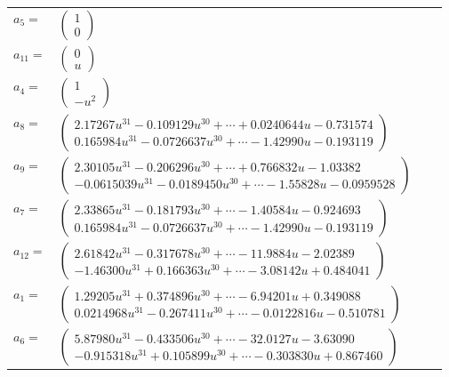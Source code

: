 \documentclass[1p]{elsarticle_modified}
\theoremstyle{definition}
\begin{document}
\begin{tabular}{m{7pt} m{180pt} m{7pt} m{180pt} }
\flushright $a_{5}=$&$\begin{pmatrix}1\\0\end{pmatrix}$ \\
\flushright $a_{11}=$&$\begin{pmatrix}0\\u\end{pmatrix}$ \\
\flushright $a_{4}=$&$\begin{pmatrix}1\\- u^2\end{pmatrix}$ \\
\flushright $a_{8}=$&$\begin{pmatrix}2.17267 u^{31}-0.109129 u^{30}+\cdots+0.0240644 u-0.731574\\0.165984 u^{31}-0.0726637 u^{30}+\cdots-1.42990 u-0.193119\end{pmatrix}$ \\
\flushright $a_{9}=$&$\begin{pmatrix}2.30105 u^{31}-0.206296 u^{30}+\cdots+0.766832 u-1.03382\\-0.0615039 u^{31}-0.0189450 u^{30}+\cdots-1.55828 u-0.0959528\end{pmatrix}$ \\
\flushright $a_{7}=$&$\begin{pmatrix}2.33865 u^{31}-0.181793 u^{30}+\cdots-1.40584 u-0.924693\\0.165984 u^{31}-0.0726637 u^{30}+\cdots-1.42990 u-0.193119\end{pmatrix}$ \\
\flushright $a_{12}=$&$\begin{pmatrix}2.61842 u^{31}-0.317678 u^{30}+\cdots-11.9884 u-2.02389\\-1.46300 u^{31}+0.166363 u^{30}+\cdots-3.08142 u+0.484041\end{pmatrix}$ \\
\flushright $a_{1}=$&$\begin{pmatrix}1.29205 u^{31}+0.374896 u^{30}+\cdots-6.94201 u+0.349088\\0.0214968 u^{31}-0.267411 u^{30}+\cdots-0.0122816 u-0.510781\end{pmatrix}$ \\
\flushright $a_{6}=$&$\begin{pmatrix}5.87980 u^{31}-0.433506 u^{30}+\cdots-32.0127 u-3.63090\\-0.915318 u^{31}+0.105899 u^{30}+\cdots-0.303830 u+0.867460\end{pmatrix}$ \\

\end{tabular}
\end{document}
